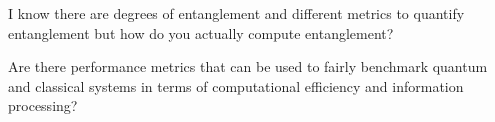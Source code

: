 \documentclass{alex_summary}
\begin{document}
\begin{question1}
	I know there are degrees of entanglement and different metrics to quantify entanglement but how do you actually compute entanglement? 
\end{question1}


\begin{question3}
	Are there performance metrics that can be used to fairly benchmark quantum and classical systems in terms of computational efficiency and information processing?
\end{question3}

\printbibliography
\end{document}
